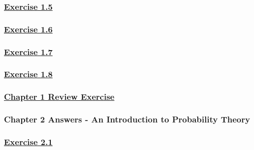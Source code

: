 \documentclass[
  11pt,
]{book}
\begin{document}
\subsubsection*{\texorpdfstring{\hyperref[ex15q]{Exercise 1.5}}{Exercise 1.5}}\label{exercise-1.5-1}

\subsubsection*{\texorpdfstring{\hyperref[ex16q]{Exercise 1.6}}{Exercise 1.6}}\label{exercise-1.6-1}

\subsubsection*{\texorpdfstring{\hyperref[ex17q]{Exercise 1.7}}{Exercise 1.7}}\label{exercise-1.7-1}

\subsubsection*{\texorpdfstring{\hyperref[ex18q]{Exercise 1.8}}{Exercise 1.8}}\label{exercise-1.8-1}

\subsubsection*{\texorpdfstring{\hyperref[re1q]{Chapter 1 Review Exercise}}{Chapter 1 Review Exercise}}\label{chapter-1-review-exercise}

\subsubsection*{Chapter 2 Answers - An Introduction to Probability Theory}\label{chapter-2-answers---an-introduction-to-probability-theory}

\subsubsection*{\texorpdfstring{\hyperref[ex21q]{Exercise 2.1}}{Exercise 2.1}}\label{exercise-2.1-1}
\end{document}
